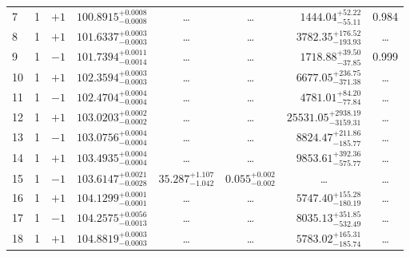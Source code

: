 \begin{table*}[!]
\begin{tabular}{llcrrlrc}
7 & 1 & $+1$ & $    100.8915_{-      0.0008}^{+      0.0008}$ & \multicolumn{1}{c}{\dots} & \multicolumn{1}{c}{\dots} & $     1444.04_{-       55.11}^{+       52.22}$ & 0.984\\[1pt]
8 & 1 & $+1$ & $    101.6337_{-      0.0003}^{+      0.0003}$ & \multicolumn{1}{c}{\dots} & \multicolumn{1}{c}{\dots} & $     3782.35_{-      193.93}^{+      176.52}$ & \dots \\[1pt]
9 & 1 & $-1$ & $    101.7394_{-      0.0014}^{+      0.0011}$ & \multicolumn{1}{c}{\dots} & \multicolumn{1}{c}{\dots} & $     1718.88_{-       37.85}^{+       39.50}$ & 0.999\\[1pt]
10 & 1 & $+1$ & $    102.3594_{-      0.0003}^{+      0.0003}$ & \multicolumn{1}{c}{\dots} & \multicolumn{1}{c}{\dots} & $     6677.05_{-      371.38}^{+      236.75}$ & \dots \\[1pt]
11 & 1 & $-1$ & $    102.4704_{-      0.0004}^{+      0.0004}$ & \multicolumn{1}{c}{\dots} & \multicolumn{1}{c}{\dots} & $     4781.01_{-       77.84}^{+       84.20}$ & \dots \\[1pt]
12 & 1 & $+1$ & $    103.0203_{-      0.0002}^{+      0.0002}$ & \multicolumn{1}{c}{\dots} & \multicolumn{1}{c}{\dots} & $    25531.05_{-     3159.31}^{+     2938.19}$ & \dots \\[1pt]
13 & 1 & $-1$ & $    103.0756_{-      0.0004}^{+      0.0004}$ & \multicolumn{1}{c}{\dots} & \multicolumn{1}{c}{\dots} & $     8824.47_{-      185.77}^{+      211.86}$ & \dots \\[1pt]
14 & 1 & $+1$ & $    103.4935_{-      0.0004}^{+      0.0004}$ & \multicolumn{1}{c}{\dots} & \multicolumn{1}{c}{\dots} & $     9853.61_{-      575.77}^{+      392.36}$ & \dots \\[1pt]
15 & 1 & $-1$ & $    103.6147_{-      0.0028}^{+      0.0021}$ & $      35.287_{-       1.042}^{+       1.107}$ & $       0.055_{-       0.002}^{+       0.002}$ & \multicolumn{1}{c}{\dots} & \dots \\[1pt]
16 & 1 & $+1$ & $    104.1299_{-      0.0001}^{+      0.0001}$ & \multicolumn{1}{c}{\dots} & \multicolumn{1}{c}{\dots} & $     5747.40_{-      180.19}^{+      155.28}$ & \dots \\[1pt]
17 & 1 & $-1$ & $    104.2575_{-      0.0013}^{+      0.0056}$ & \multicolumn{1}{c}{\dots} & \multicolumn{1}{c}{\dots} & $     8035.13_{-      532.49}^{+      351.85}$ & \dots \\[1pt]
18 & 1 & $+1$ & $    104.8819_{-      0.0003}^{+      0.0003}$ & \multicolumn{1}{c}{\dots} & \multicolumn{1}{c}{\dots} & $     5783.02_{-      185.74}^{+      165.31}$ & \dots \\[1pt]

\end{tabular}
\end{table*}
